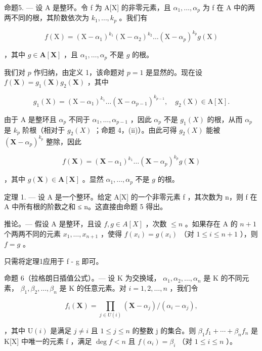 命题5. --- 设 A 是整环。令 f 为 A{[}X{]} 的非零元素，且 \(\alpha_{1},\ldots,\alpha_{p}\) 为 f 在 A 中的两两不同的根，其阶数依次为 \(k_{1},\ldots,k_{p}\) 。我们有

\[
f (\mathrm{X}) = \left(\mathrm{X} - \alpha_ {1}\right) ^ {k _ {1}} \left(\mathrm{X} - \alpha_ {2}\right) ^ {k _ {2}} \dots \left(\mathrm{X} - \alpha_ {p}\right) ^ {k _ {p}} g (\mathrm{X})
\]

，其中 \(g \in \mathbf{A}[\mathbf{X}]\) ，且 \(\alpha_1, \ldots, \alpha_p\) 不是 \(g\) 的根。

我们对 \(p\) 作归纳，由定义 1，该命题对 \(p = 1\) 是显然的。现在设 \(f(\mathbf{X}) = g_1(\mathbf{X})g_2(\mathbf{X})\) ，其中

\[
g _ {1} (\mathrm{X}) = \left(\mathrm{X} - \alpha_ {1}\right) ^ {k _ {1}} \dots \left(\mathrm{X} - \alpha_ {p - 1}\right) ^ {k _ {p - 1}}, \quad g _ {2} (\mathrm{X}) \in \mathrm{A} [ \mathrm{X} ].
\]

由于 A 是整环且 \(\alpha_{p}\) 不同于 \(\alpha_{1},\ldots,\alpha_{p-1}\) ，因此 \(\alpha_{p}\) 不是 \(g_{1}(X)\) 的根，从而 \(\alpha_{p}\) 是 \(k_{p}\) 阶根（相对于 \(g_{2}(X)\) ；命题 4，(ii)）。由此可得 \(g_{2}(X)\) 能被 \((\mathbf{X}-\alpha_{p})^{k_{p}}\) 整除，因此

\[
f (\mathbf {X}) = \left(\mathbf {X} - \alpha_ {1}\right) ^ {k _ {1}} \dots \left(\mathbf {X} - \alpha_ {p}\right) ^ {k _ {p}} g (\mathbf {X})
\]

，其中 \(g(\mathbf{X}) \in \mathbf{A}[\mathbf{X}]\) 。显然 \(\alpha_1, \ldots, \alpha_p\) 不是 \(g\) 的根。

定理 1. --- 设 A 是一个整环。给定 A{[}X{]} 的一个非零元素 f ，其次数为 n，则 f 在 A 中所有根的阶数之和 ≤ n。这直接由命题 5 得出。

推论。--- 假设 A 是整环，且设 \(f, g \in A[X]\) ，次数 \(\leqslant n\) 。如果存在 A 的 \(n+1\) 个两两不同的元素 \(x_{1}, \ldots, x_{n+1}\) ，使得 \(f(x_{i}) = g(x_{i})\) （对 \(1 \leqslant i \leqslant n+1\) ），则 \(f = g\) 。

只需将定理1应用于 f - g 即可。

命题 6（拉格朗日插值公式）。--- 设 K 为交换域， \(\alpha_{1}, \alpha_{2}, \ldots, \alpha_{n}\) 是 K 的不同元素， \(\beta_{1}, \beta_{2}, \ldots, \beta_{n}\) 是 K 的任意元素。对 \(i = 1, 2, \ldots, n\) ，我们令

\[
f _ {i} (\mathbf {X}) = \prod_ {j \in U (i)} \left(\mathbf {X} - \alpha_ {j}\right) / \left(\alpha_ {i} - \alpha_ {j}\right),
\]

，其中 \(\mathrm{U}(i)\) 是满足 \(j \neq i\) 且 \(1 \leqslant j \leqslant n\) 的整数 j 的集合。则 \(\beta_{1}f_{1} + \cdots + \beta_{n}f_{n}\) 是 K{[}X{]} 中唯一的元素 f ，满足 \(\deg f < n\) 且 \(f(\alpha_{i}) = \beta_{i}\) （对 \(1 \leqslant i \leqslant n\) ）。

